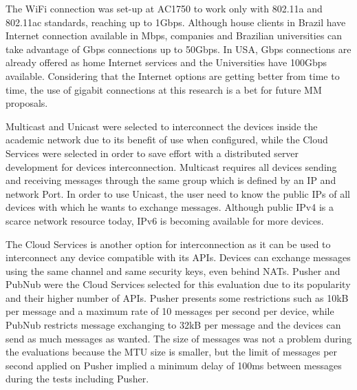The WiFi connection was set-up at AC1750 to work only with 802.11a and 802.11ac standards, reaching up to 1Gbps.
Although house clients in Brazil have Internet connection available in Mbps, companies and Brazilian universities can take advantage of Gbps connections up to 50Gbps.
In USA, Gbps connections are already offered as home Internet services and the Universities have 100Gbps available.
Considering that the Internet options are getting better from time to time, the use of gigabit connections at this research is a bet for future MM proposals.

Multicast and Unicast were selected to interconnect the devices inside the academic network due to its benefit of use when configured, while the Cloud Services were selected in order to save effort with a distributed server development for devices interconnection.
Multicast requires all devices sending and receiving messages through the same group which is defined by an IP and network Port.
In order to use Unicast, the user need to know the public IPs of all devices with which he wants to exchange messages.
Although public IPv4 is a scarce network resource today, IPv6 is becoming available for more devices.

The Cloud Services is another option for interconnection as it can be used to interconnect any device compatible with its APIs.
Devices can exchange messages using the same channel and same security keys, even behind NATs.
Pusher and PubNub were the Cloud Services selected for this evaluation due to its popularity and their higher number of APIs.
Pusher presents some restrictions such as 10kB per message and a maximum rate of 10 messages per second per device, while PubNub restricts message exchanging to 32kB per message and the devices can send as much messages as wanted.
The size of messages was not a problem during the evaluations because the MTU size is smaller, but the limit of messages per second applied on Pusher implied a minimum delay of 100ms between messages during the tests including Pusher.

